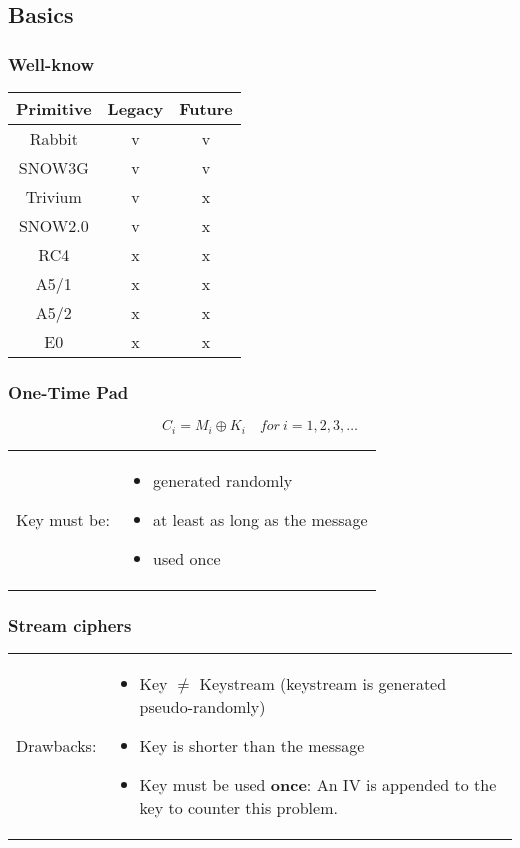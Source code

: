
\subsection{Basics}
\subsubsection{Well-know}
\begin{center}
    \begin{tabular}{|c|c|c|}
        \hline
        Primitive & Legacy & Future\\
        \hline
        Rabbit & \textcolor{green!50!black}{v} & \textcolor{green!50!black}{v}\\
        SNOW3G & \textcolor{green!50!black}{v} & \textcolor{green!50!black}{v}\\
        \hline
        Trivium & \textcolor{green!50!black}{v} &
        \textcolor{red!50!black}{x}\\
        SNOW2.0 & \textcolor{green!50!black}{v} & \textcolor{red!50!black}{x}\\
        \hline
        RC4 & \textcolor{red!50!black}{x} & \textcolor{red!50!black}{x}\\
        A5/1 & \textcolor{red!50!black}{x} & \textcolor{red!50!black}{x}\\
        A5/2 & \textcolor{red!50!black}{x} & \textcolor{red!50!black}{x}\\
        E0 & \textcolor{red!50!black}{x} & \textcolor{red!50!black}{x}\\
        \hline
    \end{tabular}
\end{center}

\subsubsection{One-Time Pad} 
$$C_i = M_i \oplus K_i\quad for\ i=1,2,3,\ldots$$

\begin{tabular}{m{3cm}m{8cm}}
    Key must be:&
\begin{itemize}
    \item generated randomly
    \item at least as long as the message
    \item used once
\end{itemize}
\end{tabular}


\subsubsection{Stream ciphers}
\begin{tabular}{m{2cm}m{14cm}}
    Drawbacks: &
    \begin{itemize}
        \item Key $\neq$ Keystream (keystream is generated
            pseudo-randomly)
        \item Key is shorter than the message
        \item Key must be used \textbf{once}: An IV is appended to the key to
            counter this problem.
    \end{itemize}
\end{tabular}

